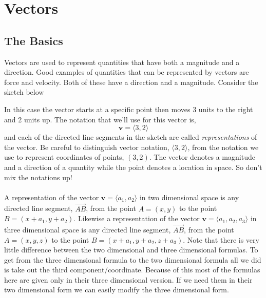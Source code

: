 \documentclass[10pt,reqno]{book}
\title{\myfont{Calculus III}}
\author{Lukas Zamora}
\date{November 28, 2017}
\theoremstyle{definition}
\renewcommand{\vec}[1]{\mathbf{#1}}
\begin{document}
	\maketitle

	\tableofcontents

	\chapter{Vectors}

	\section{The Basics}

	Vectors are used to represent quantities that have both a magnitude and a direction.  Good examples of quantities that can be represented by vectors are force and velocity.  Both of these have a direction and a magnitude. Consider the sketch below
	\begin{center}
	\end{center}
	In this case the vector starts at a specific point then moves 3 units to the right and 2 units up. The notation that we'll use for this vector is,
	\[ \vec{v} = \langle 3,2 \rangle \]
	and each of the directed line segments in the sketch are called \textit{representations} of the vector. Be careful to distinguish vector notation, $ \langle 3,2 \rangle $, from the notation we use to represent coordinates of points, $(3,2)$. The vector denotes a magnitude and a direction of a quantity while the point denotes a location in space. So don't mix the notations up!\\ \\
	A representation of the vector $ \vec{v} = \langle a_1,a_2 \rangle $ in two dimensional space is any directed line segment, $\overrightarrow{AB}$, from the point $A=(x,y)$ to the point $B = (x+a_1, y+a_2)$. Likewise a representation of the vector $\vec{v} = \langle a_1,a_2,a_3 \rangle$ in three dimensional space is any directed line segment, $\overrightarrow{AB}$, from the point $A=(x,y,z)$ to the point $B = (x+a_1,y+a_2,z+a_3)$. Note that there is very little difference between the two dimensional and three dimensional formulas. To get from the three dimensional formula to the two dimensional formula all we did is take out the third component/coordinate. Because of this most of the formulas here are given only in their three dimensional version. If we need them in their two dimensional form we can easily modify the three dimensional form.\\ \\
\end{document}
